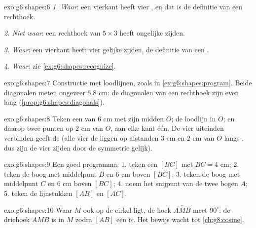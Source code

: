 \begin{solution}{exo:g6:shapes:6}
\emph{1. Waar}: een vierkant heeft vier , en dat is de definitie
van een rechthoek.

\emph{2. Niet waar}: een rechthoek van $5 \times 3$ heeft ongelijke zijden.

\emph{3. Waar}: een vierkant heeft vier gelijke zijden, de definitie van een
.

\emph{4. Waar}: zie \cref{ex:g6:shapes:recognize}.
\end{solution}

\begin{solution}{exo:g6:shapes:7}
Constructie met loodlijnen, zoals in \cref{ex:g6:shapes:program}. Beide
diagonalen meten ongeveer $5.8$ cm: de diagonalen van een rechthoek zijn even
lang (\cref{prop:g6:shapes:diagonals}).
\end{solution}

\begin{solution}{exo:g6:shapes:8}
Teken een  van $6$ cm met zijn midden $O$; de loodlijn in $O$; en
daarop twee punten op $2$ cm van $O$, aan elke kant één. De vier uiteinden
verbinden geeft de  (alle vier de  liggen op afstanden $3$ cm en
$2$ cm van $O$ langs , dus zijn de vier zijden door de
symmetrie gelijk).
\end{solution}

\begin{solution}{exo:g6:shapes:9}
Een goed programma:
1. teken een  $[BC]$ met $BC = 4$ cm;
2. teken de boog met middelpunt $B$ en  $6$ cm boven $[BC]$;
3. teken de boog met middelpunt $C$ en  $6$ cm boven $[BC]$;
4. noem het snijpunt van de twee bogen $A$;
5. teken de lijnstukken $[AB]$ en $[AC]$.
\end{solution}

\begin{solution}{exo:g6:shapes:10}
Waar $M$ ook op de cirkel ligt, de hoek $\widehat{AMB}$ meet $90^\circ$: de
driehoek $AMB$ is  in $M$ zodra $[AB]$ een  is. Het bewijs
wacht tot \cref{ch:g8:cosine}.
\end{solution}


